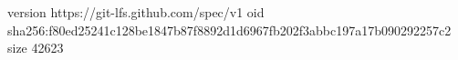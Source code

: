 version https://git-lfs.github.com/spec/v1
oid sha256:f80ed25241c128be1847b87f8892d1d6967fb202f3abbc197a17b090292257c2
size 42623
